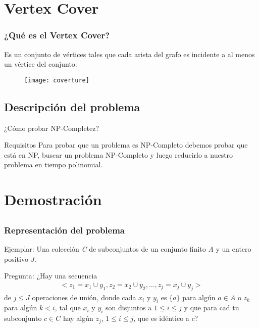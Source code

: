 \documentclass{beamer}
\begin{document}
\section{Vertex Cover}

\begin{frame}
    \frametitle{¿Qué es el Vertex Cover?}
    Es un conjunto de vértices tales que cada arista del grafo es incidente a al menos un vértice del conjunto.
    \begin{figure}[H]
      \centering
      \texttt{[image: coverture]}
    \end{figure}
\end{frame}


\subsection{Descripción del problema}
\begin{frame}{¿Cómo probar NP-Completez?}
\begin{block}{Requisitos}
Para probar que un problema es NP-Completo debemos probar que está en NP, buscar un problema NP-Completo y luego reducirlo a nuestro problema en tiempo polinomial.
\end{block}
\end{frame}

\section{Demostración}

\subsection{}

\begin{frame}
    \frametitle{Representación del problema}
    \begin{block}{Ejemplar:}
        Una colección \textit{C} de subconjuntos de un conjunto finito \textit{A} y un entero positivo \textit{J}.
    \end{block}
    \begin{block}{Pregunta:}
        ¿Hay una secuencia
        \begin{align*}
            <z_1 = x_1 \cup y_1 , z_2 = x_2 \cup y_2, \dots, z_j = x_j \cup y_j>
        \end{align*}
        de $j \leq J$ operaciones de unión, donde cada $x_i$ y $y_i$ es $\{a\}$ para algún $a \in A$ o $z_k$ para algún $k < i$, tal que $x_i$ y $y_i$ son disjuntos a $1 \leq i \leq j$ y que para cad tu subconjunto $c \in C$ hay algún $z_j$, $1 \leq i \leq j$, que es idéntico a $c$? 
    \end{block}
\end{frame}
\end{document}
